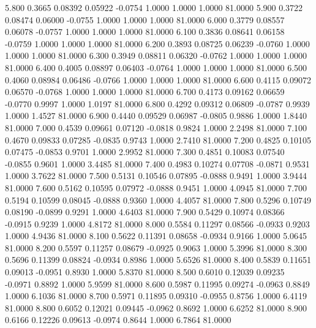    5.800   0.3665   0.08392   0.05922  -0.0754   1.0000   1.0000   1.0000  81.0000
   5.900   0.3722   0.08474   0.06000  -0.0755   1.0000   1.0000   1.0000  81.0000
   6.000   0.3779   0.08557   0.06078  -0.0757   1.0000   1.0000   1.0000  81.0000
   6.100   0.3836   0.08641   0.06158  -0.0759   1.0000   1.0000   1.0000  81.0000
   6.200   0.3893   0.08725   0.06239  -0.0760   1.0000   1.0000   1.0000  81.0000
   6.300   0.3949   0.08811   0.06320  -0.0762   1.0000   1.0000   1.0000  81.0000
   6.400   0.4005   0.08897   0.06403  -0.0764   1.0000   1.0000   1.0000  81.0000
   6.500   0.4060   0.08984   0.06486  -0.0766   1.0000   1.0000   1.0000  81.0000
   6.600   0.4115   0.09072   0.06570  -0.0768   1.0000   1.0000   1.0000  81.0000
   6.700   0.4173   0.09162   0.06659  -0.0770   0.9997   1.0000   1.0197  81.0000
   6.800   0.4292   0.09312   0.06809  -0.0787   0.9939   1.0000   1.4527  81.0000
   6.900   0.4440   0.09529   0.06987  -0.0805   0.9886   1.0000   1.8440  81.0000
   7.000   0.4539   0.09661   0.07120  -0.0818   0.9824   1.0000   2.2498  81.0000
   7.100   0.4670   0.09833   0.07285  -0.0835   0.9743   1.0000   2.7410  81.0000
   7.200   0.4825   0.10105   0.07475  -0.0853   0.9701   1.0000   2.9952  81.0000
   7.300   0.4851   0.10083   0.07540  -0.0855   0.9601   1.0000   3.4485  81.0000
   7.400   0.4983   0.10274   0.07708  -0.0871   0.9531   1.0000   3.7622  81.0000
   7.500   0.5131   0.10546   0.07895  -0.0888   0.9491   1.0000   3.9444  81.0000
   7.600   0.5162   0.10595   0.07972  -0.0888   0.9451   1.0000   4.0945  81.0000
   7.700   0.5194   0.10599   0.08045  -0.0888   0.9360   1.0000   4.4057  81.0000
   7.800   0.5296   0.10749   0.08190  -0.0899   0.9291   1.0000   4.6403  81.0000
   7.900   0.5429   0.10974   0.08366  -0.0915   0.9239   1.0000   4.8172  81.0000
   8.000   0.5584   0.11297   0.08566  -0.0933   0.9203   1.0000   4.9436  81.0000
   8.100   0.5622   0.11391   0.08658  -0.0934   0.9166   1.0000   5.0645  81.0000
   8.200   0.5597   0.11257   0.08679  -0.0925   0.9063   1.0000   5.3996  81.0000
   8.300   0.5696   0.11399   0.08824  -0.0934   0.8986   1.0000   5.6526  81.0000
   8.400   0.5839   0.11651   0.09013  -0.0951   0.8930   1.0000   5.8370  81.0000
   8.500   0.6010   0.12039   0.09235  -0.0971   0.8892   1.0000   5.9599  81.0000
   8.600   0.5987   0.11995   0.09274  -0.0963   0.8849   1.0000   6.1036  81.0000
   8.700   0.5971   0.11895   0.09310  -0.0955   0.8756   1.0000   6.4119  81.0000
   8.800   0.6052   0.12021   0.09445  -0.0962   0.8692   1.0000   6.6252  81.0000
   8.900   0.6166   0.12226   0.09613  -0.0974   0.8644   1.0000   6.7864  81.0000
